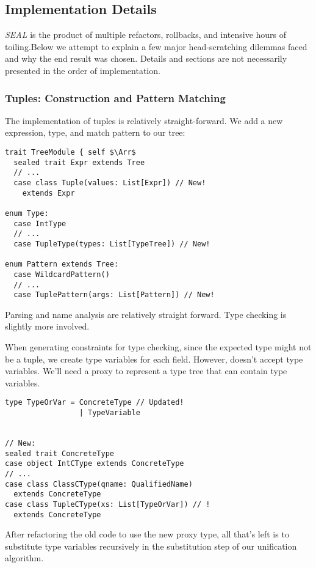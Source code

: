 \subsection{Implementation Details}
\textit{SEAL} is the product of multiple refactors, rollbacks, and intensive hours of toiling.\footnotemark Below we attempt to explain a few major head-scratching dilemmas faced and why the end result was chosen. Details and sections are not necessarily presented in the order of implementation.


\subsubsection{Tuples: Construction and Pattern Matching}
The implementation of tuples is relatively straight-forward. We add a new expression, type, and match pattern to our tree:
\begin{lstlisting}
trait TreeModule { self $\Arr$
  sealed trait Expr extends Tree
  // ...
  case class Tuple(values: List[Expr]) // New!
    extends Expr

enum Type:
  case IntType
  // ...
  case TupleType(types: List[TypeTree]) // New!

enum Pattern extends Tree:
  case WildcardPattern()
  // ...
  case TuplePattern(args: List[Pattern]) // New!
\end{lstlisting}
\label{lst:impl-tp-1}
Parsing and name analysis are relatively straight forward. Type checking is slightly more involved.

When generating constraints for type checking, since the expected type might not be a tuple, we create type variables for each field. However,  doesn't accept type variables. We'll need a proxy to represent a type tree that can contain type variables.

\begin{lstlisting}
type TypeOrVar = ConcreteType // Updated!
                 | TypeVariable


// New:
sealed trait ConcreteType
case object IntCType extends ConcreteType
// ...
case class ClassCType(qname: QualifiedName)
  extends ConcreteType
case class TupleCType(xs: List[TypeOrVar]) // !
  extends ConcreteType
\end{lstlisting}
After refactoring the old code to use the new proxy type, all that's left is to substitute type variables recursively in the substitution step of our unification algorithm.

